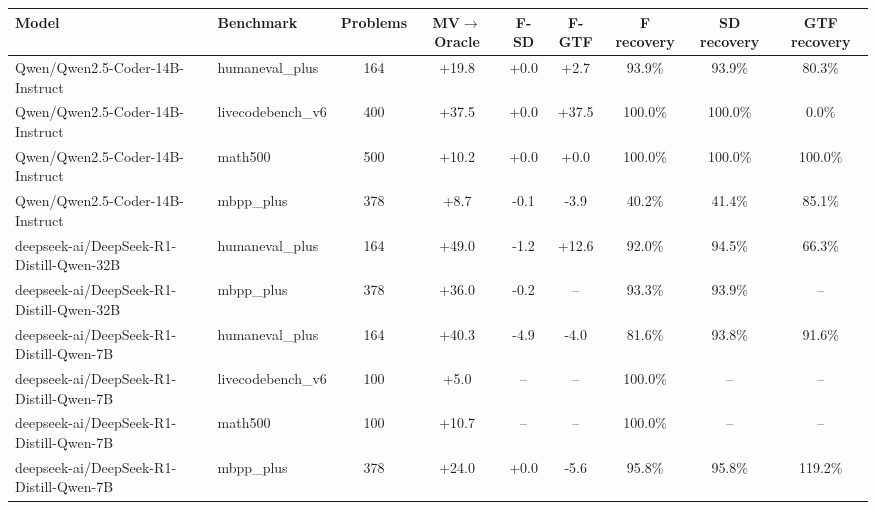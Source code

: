 \begin{tabular}{llccccccc}
\toprule
Model & Benchmark & Problems & MV$\rightarrow$Oracle & F-SD & F-GTF & F recovery & SD recovery & GTF recovery \\
\midrule
Qwen/Qwen2.5-Coder-14B-Instruct & humaneval_plus & 164 & +19.8 & +0.0 & +2.7 & 93.9\% & 93.9\% & 80.3\% \\
Qwen/Qwen2.5-Coder-14B-Instruct & livecodebench_v6 & 400 & +37.5 & +0.0 & +37.5 & 100.0\% & 100.0\% & 0.0\% \\
Qwen/Qwen2.5-Coder-14B-Instruct & math500 & 500 & +10.2 & +0.0 & +0.0 & 100.0\% & 100.0\% & 100.0\% \\
Qwen/Qwen2.5-Coder-14B-Instruct & mbpp_plus & 378 & +8.7 & -0.1 & -3.9 & 40.2\% & 41.4\% & 85.1\% \\
deepseek-ai/DeepSeek-R1-Distill-Qwen-32B & humaneval_plus & 164 & +49.0 & -1.2 & +12.6 & 92.0\% & 94.5\% & 66.3\% \\
deepseek-ai/DeepSeek-R1-Distill-Qwen-32B & mbpp_plus & 378 & +36.0 & -0.2 & -- & 93.3\% & 93.9\% & -- \\
deepseek-ai/DeepSeek-R1-Distill-Qwen-7B & humaneval_plus & 164 & +40.3 & -4.9 & -4.0 & 81.6\% & 93.8\% & 91.6\% \\
deepseek-ai/DeepSeek-R1-Distill-Qwen-7B & livecodebench_v6 & 100 & +5.0 & -- & -- & 100.0\% & -- & -- \\
deepseek-ai/DeepSeek-R1-Distill-Qwen-7B & math500 & 100 & +10.7 & -- & -- & 100.0\% & -- & -- \\
deepseek-ai/DeepSeek-R1-Distill-Qwen-7B & mbpp_plus & 378 & +24.0 & +0.0 & -5.6 & 95.8\% & 95.8\% & 119.2\% \\
\bottomrule
\end{tabular}
